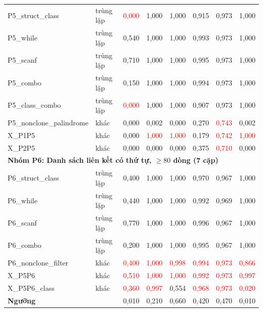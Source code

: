 \documentclass[11pt,a4paper]{article}
\begin{document}
{\begin{longtable}{llcccccc}
\midrule
P5\_struct\_class      & trùng lặp  & \textcolor{red}{0,000} & 1,000 & 1,000 & 0,915 & 0,973 & 1,000 \\
P5\_while              & trùng lặp  & 0,540 & 1,000 & 1,000 & 0,993 & 0,973 & 1,000 \\
P5\_scanf              & trùng lặp  & 0,710 & 1,000 & 1,000 & 0,995 & 0,973 & 1,000 \\
P5\_combo              & trùng lặp  & 0,150 & 1,000 & 1,000 & 0,994 & 0,973 & 1,000 \\
P5\_class\_combo       & trùng lặp  & \textcolor{red}{0,000} & 1,000 & 1,000 & 0,907 & 0,973 & 1,000 \\
P5\_nonclone\_palindrome & khác     & 0,000 & 0,002 & 0,000 & 0,270 & \textcolor{red}{0,743} & 0,002 \\
X\_P1P5                & khác       & 0,000 & \textcolor{red}{1,000} & \textcolor{red}{1,000} & 0,179 & \textcolor{red}{0,742} & \textcolor{red}{1,000} \\
X\_P2P5                & khác       & 0,000 & 0,000 & 0,000 & 0,375 & \textcolor{red}{0,710} & 0,000 \\
\midrule
\multicolumn{8}{l}{\textbf{Nhóm P6: Danh sách liên kết có thứ tự, $\ge 80$ dòng (7 cặp)}} \\
\midrule
P6\_struct\_class      & trùng lặp  & 0,400 & 1,000 & 1,000 & 0,970 & 0,967 & 1,000 \\
P6\_while              & trùng lặp  & 0,440 & 1,000 & 1,000 & 0,992 & 0,969 & 1,000 \\
P6\_scanf              & trùng lặp  & 0,770 & 1,000 & 1,000 & 0,996 & 0,967 & 1,000 \\
P6\_combo              & trùng lặp  & 0,200 & 1,000 & 1,000 & 0,995 & 0,967 & 1,000 \\
P6\_nonclone\_filter   & khác       & \textcolor{red}{0,400} & \textcolor{red}{1,000} & \textcolor{red}{0,998} & \textcolor{red}{0,994} & \textcolor{red}{0,973} & \textcolor{red}{0,866} \\
X\_P5P6                & khác       & \textcolor{red}{0,510} & \textcolor{red}{1,000} & \textcolor{red}{1,000} & \textcolor{red}{0,992} & \textcolor{red}{0,973} & \textcolor{red}{0,997} \\
X\_P5P6\_class         & khác       & \textcolor{red}{0,360} & \textcolor{red}{0,997} & 0,554 & \textcolor{red}{0,968} & \textcolor{red}{0,973} & \textcolor{red}{0,020} \\
\midrule
\textbf{Ngưỡng}        &            & 0,010 & 0,210 & 0,660 & 0,420 & 0,470 & 0,010 \\

\end{longtable}}
\end{document}
